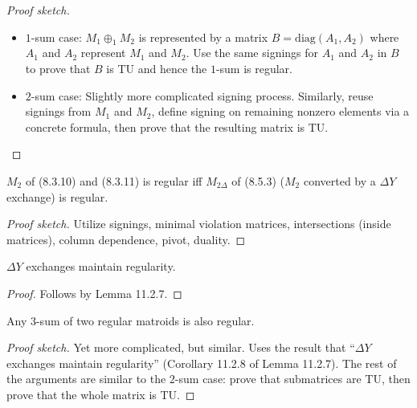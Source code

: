 \begin{proof}[Proof sketch]
  \begin{itemize}
    \item $1$-sum case: $M_{1} \oplus_{1} M_{2}$ is represented by a matrix $B = \mathrm{diag} (A_{1}, A_{2})$ where $A_{1}$ and $A_{2}$ represent $M_{1}$ and $M_{2}$. Use the same signings for $A_{1}$ and $A_{2}$ in $B$ to prove that $B$ is TU and hence the $1$-sum is regular.
    \item $2$-sum case: Slightly more complicated signing process. Similarly, reuse signings from $M_{1}$ and $M_{2}$, define signing on remaining nonzero elements via a concrete formula, then prove that the resulting matrix is TU.
  \end{itemize}
\end{proof}

\begin{lemma}[11.2.7]
  \label{lem:11.2.7}
  $M_{2}$ of (8.3.10) and (8.3.11) is regular iff $M_{2\Delta}$ of (8.5.3) ($M_{2}$ converted by a $\Delta Y$ exchange) is regular.
\end{lemma}

\begin{proof}[Proof sketch]
  Utilize signings, minimal violation matrices, intersections (inside matrices), column dependence, pivot, duality.
\end{proof}

\begin{corollary}[11.2.8]
  \label{cor:11.2.8}
  $\Delta Y$ exchanges maintain regularity.
\end{corollary}

\begin{proof}
  Follows by Lemma 11.2.7.
\end{proof}

\begin{lemma}[11.2.9]
  \label{lem:11.2.9}
  Any $3$-sum of two regular matroids is also regular.
\end{lemma}

\begin{proof}[Proof sketch]
  Yet more complicated, but similar. Uses the result that ``$\Delta Y$ exchanges maintain regularity'' (Corollary 11.2.8 of Lemma 11.2.7). The rest of the arguments are similar to the $2$-sum case: prove that submatrices are TU, then prove that the whole matrix is TU.
\end{proof}

